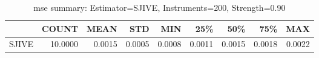 \begin{table}[ht]
\centering
\caption{mse summary: Estimator=SJIVE, Instruments=200, Strength=0.90}
\begin{tabular}{lrrrrrrrr}
\toprule
 & COUNT & MEAN & STD & MIN & 25\% & 50\% & 75\% & MAX \\
\midrule
SJIVE & 10.0000 & 0.0015 & 0.0005 & 0.0008 & 0.0011 & 0.0015 & 0.0018 & 0.0022 \\
\bottomrule
\end{tabular}
\end{table}
